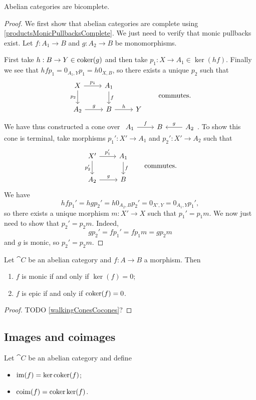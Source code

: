 \begin{proposition}
Abelian categories are bicomplete.
\end{proposition}
\begin{proof}
We first show that abelian categories are complete using \ref{productsMonicPullbacksComplete}. We just need to verify that monic pullbacks exist. Let $f: A_1\to B$ and $g: A_2\to B$ be monomorphisms.

First take $h: B\to Y\in \operatorname{coker}(g)$ and then take $p_1: X\to A_1 \in \ker(hf)$. Finally we see that $hfp_1 = 0_{A_1, Y}p_1 = h0_{X,B}$, so there exists a unique $p_2$ such that
\[ \begin{tikzcd}
X \arrow[r, "{p_1}"] \arrow[d, swap, "{p_2}"] & A_1 \arrow[d, "f"] & \\
A_2 \arrow[r, "g"] & B \arrow[r, "h"] & Y
\end{tikzcd} \qquad\text{commutes.} \]
We have thus constructed a cone over $\begin{tikzcd}
A_1 \arrow[r, "f"] & B & \arrow[l, swap, "g"] A_2
\end{tikzcd}$. To show this cone is terminal, take morphisms $p_1': X'\to A_1$ and $p_2': X'\to A_2$ such that
\[ \begin{tikzcd}
X' \arrow[r, "{p_1'}"] \arrow[d, swap, "{p_2'}"] & A_1 \arrow[d, "f"] \\
A_2 \arrow[r, "g"] & B
\end{tikzcd}\qquad \text{commutes.} \]
We have
\[ hfp_1' = hgp_2' = h0_{A_2, B}p_2' = 0_{X',Y} = 0_{A_1, Y}p_1', \]
so there exists a unique morphism $m:X'\to X$ such that $p_1' = p_1m$. We now just need to show that $p_2' = p_2m$. Indeed,
\[ gp_2' = fp_1' = fp_1m = gp_2m \]
and $g$ is monic, so $p_2' = p_2m$.
\end{proof}

\begin{proposition}
Let $\cat{C}$ be an abelian category and $f: A\to B$ a morphism. Then
\begin{enumerate}
\item $f$ is monic \textup{if and only if} $\ker(f) = 0$;
\item $f$ is epic \textup{if and only if} $\operatorname{coker}(f) = 0$.
\end{enumerate}
\end{proposition}
\begin{proof}
TODO \ref{walkingConesCocones}?
\end{proof}

\subsection{Images and coimages}
\begin{definition}
Let $\cat{C}$ be an abelian category and define
\begin{itemize}
\item $\operatorname{im}(f) = \ker\operatorname{coker}(f)$;
\item $\operatorname{coim}(f) = \operatorname{coker}\ker(f)$.
\end{itemize}
\end{definition}
